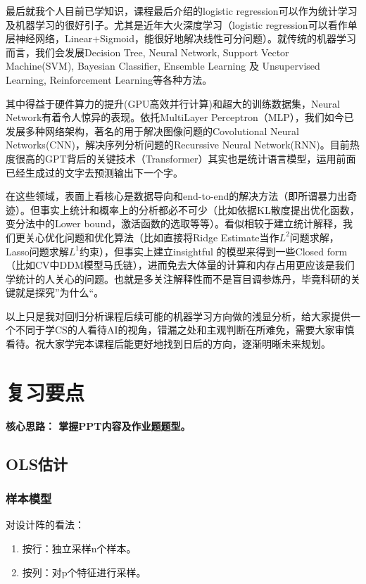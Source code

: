 \documentclass[cn,hazy,green,12pt,normal]{elegantnote}
\numberwithin{equation}{section}
\numberwithin{subsection}{section}
\begin{document}
最后就我个人目前已学知识，课程最后介绍的logistic regression可以作为统计学习及机器学习的很好引子。尤其是近年大火深度学习（logistic regression可以看作单层神经网络，Linear+Sigmoid，能很好地解决线性可分问题）。就传统的机器学习而言，我们会发展Decision Tree, Neural Network, Support Vector Machine(SVM), Bayesian Classifier, Ensemble Learning 及 Unsupervised Learning, Reinforcement Learning等各种方法。

其中得益于硬件算力的提升(GPU高效并行计算)和超大的训练数据集，Neural Network有着令人惊异的表现。依托MultiLayer Perceptron（MLP），我们如今已发展多种网络架构，著名的用于解决图像问题的Covolutional Neural Networks(CNN)，解决序列分析问题的Recurssive Neural Network(RNN)。目前热度很高的GPT背后的关键技术（Transformer）其实也是统计语言模型，运用前面已经生成过的文字去预测输出下一个字。

在这些领域，表面上看核心是数据导向和end-to-end的解决方法（即所谓暴力出奇迹）。但事实上统计和概率上的分析都必不可少（比如依据KL散度提出优化函数，变分法中的Lower bound，激活函数的选取等等）。看似相较于建立统计解释，我们更关心优化问题和优化算法（比如直接将Ridge Estimate当作$L^2$问题求解，Lasso问题求解$L^1$约束），但事实上建立insightful 的模型来得到一些Closed form（比如CV中DDM模型马氏链），进而免去大体量的计算和内存占用更应该是我们学统计的人关心的问题。也就是多关注解释性而不是盲目调参炼丹，毕竟科研的关键就是探究”为什么“。

以上只是我对回归分析课程后续可能的机器学习方向做的浅显分析，给大家提供一个不同于学CS的人看待AI的视角，错漏之处和主观判断在所难免，需要大家审慎看待。祝大家学完本课程后能更好地找到日后的方向，逐渐明晰未来规划。

\section{复习要点}
\textbf{核心思路： 掌握PPT内容及作业题题型。}

\subsection{OLS估计}
\subsubsection{样本模型}
对设计阵的看法：\begin{enumerate}
    \item 按行：独立采样n个样本。
    \item 按列：对p个特征进行采样。
\end{enumerate}
\end{document}
